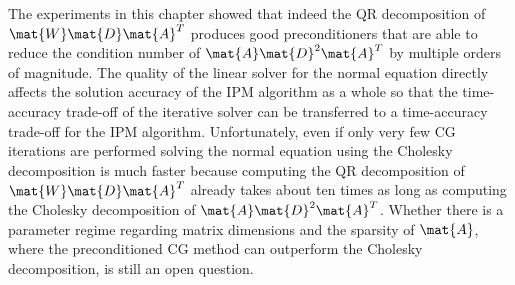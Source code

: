 The experiments in this chapter showed that indeed the QR decomposition of \(\mat{W}\mat{D}\mat{A}^T\) produces good preconditioners that are able to reduce the condition number of \(\mat{A}\mat{D}^2\mat{A}^T\) by multiple orders of magnitude.
The quality of the linear solver for the normal equation directly affects the solution accuracy of the IPM algorithm as a whole so that the time-accuracy trade-off of the iterative solver can be transferred to a time-accuracy trade-off for the IPM algorithm.
Unfortunately, even if only very few CG iterations are performed solving the normal equation using the Cholesky decomposition is much faster because computing the QR decomposition of \(\mat{W}\mat{D}\mat{A}^T\) already takes about ten times as long as computing the Cholesky decomposition of \(\mat{A}\mat{D}^2\mat{A}^T\).
Whether there is a parameter regime regarding matrix dimensions and the sparsity of \(\mat{A}\), where the preconditioned CG method can outperform the Cholesky decomposition, is still an open question.